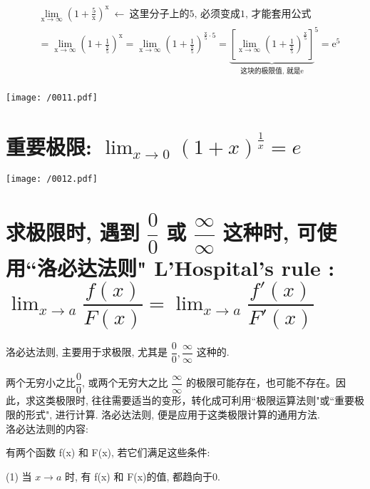 \documentclass[UTF8]{ctexart}
\begin{document}
\begin{myEnvSample}
	\begin{align*}  %
		&\lim_{\text{x}\rightarrow \infty}\left( 1+\frac{5}{\text{x}} \right) ^{\text{x}}\ \gets \ \text{这里分子上的5,\ 必须变成1,\ 才能套用公式}\\
		&=\lim_{\text{x}\rightarrow \infty}\left( 1+\frac{1}{\frac{\text{x}}{5}} \right) ^{\text{x}}=\lim_{\text{x}\rightarrow \infty}\left( 1+\frac{1}{\frac{\text{x}}{5}} \right) ^{\frac{\text{x}}{5}\cdot 5}=\underset{\text{这块的极限值,\ 就是e}}{\underbrace{\left[ \lim_{\text{x}\rightarrow \infty}\left( 1+\frac{1}{\frac{\text{x}}{5}} \right) ^{\frac{\text{x}}{5}} \right] }}^5=\text{e}^5\\
	\end{align*}
	
	\texttt{[image: /0011.pdf]}
\end{myEnvSample}





\section{重要极限: $ \boxed{\lim_{x \to 0} (1+x)^{\frac{1} {x}} =e} $}

\texttt{[image: /0012.pdf]}





\section{求极限时, 遇到 $ \dfrac{0}{0}$ 或 $\dfrac{\infty} {\infty}$ 这种时, 可使用``洛必达法则" L'Hospital's rule : $ \boxed{	\lim_{x → a}\dfrac{f(x)}{F(x)}=\lim_{x\rightarrow a}\dfrac{f'(x)}{F'(x)}}$}

洛必达法则, 主要用于求极限, 尤其是 $ \dfrac{0}{0}, \dfrac{\infty} {\infty}$ 这种的.

两个无穷小之比$ \dfrac{0}{0}$, 或两个无穷大之比 $\dfrac{\infty} {\infty}$ 的极限可能存在，也可能不存在。因此，求这类极限时, 往往需要适当的变形，转化成可利用``极限运算法则"或``重要极限的形式", 进行计算. 洛必达法则, 便是应用于这类极限计算的通用方法. \\

洛必达法则的内容: 

有两个函数 f(x) 和 F(x), 若它们满足这些条件:

(1) 当 $x \to a$ 时, 有 f(x) 和 F(x)的值, 都趋向于0.
\end{document}
